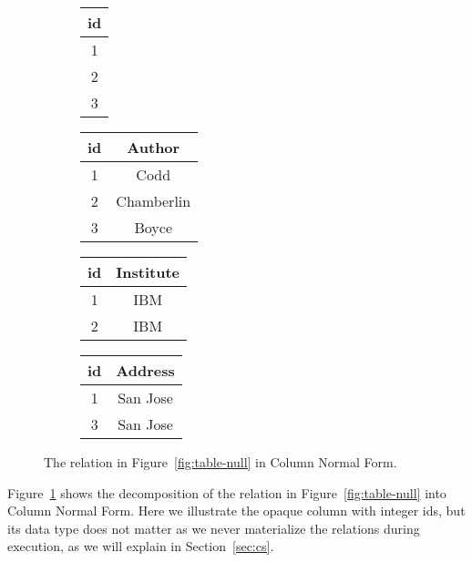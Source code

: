 \documentclass[sigconf,nonacm]{acmart}
\begin{document}
\begin{figure}
\begin{subfigure}{0.09\linewidth}
\centering
\begin{tabular}{|c|}
\hline
\textsf{id} \\
\hline
1 \\
2 \\
3 \\
\hline
\end{tabular}
\end{subfigure}
\begin{subfigure}{0.31\linewidth}
\centering
\begin{tabular}{|c|c|}
\hline
\textsf{id} & \textsf{Author} \\
\hline
1 & Codd \\
2 & Chamberlin \\
3 & Boyce \\
\hline
\end{tabular}
\end{subfigure}
\centering
\begin{subfigure}{0.26\linewidth}
\centering
\begin{tabular}{|c|c|}
\hline
\textsf{id} & \textsf{Institute} \\
\hline
1 & IBM \\
2 & IBM \\
\hline
\end{tabular}
\end{subfigure}
\begin{subfigure}{0.26\linewidth}
\centering 
\begin{tabular}{|c|c|}
\hline
\textsf{id} & \textsf{Address} \\
\hline
1 & San Jose \\
3 & San Jose \\
\hline
\end{tabular}
\end{subfigure}
\caption{The relation in Figure~\ref{fig:table-null} in Column Normal Form.}
\label{fig:cnf}
\end{figure}

\begin{example}
\label{ex:cnf}
Figure~\ref{fig:cnf} shows the decomposition of the relation 
 in Figure~\ref{fig:table-null} into Column Normal Form.
Here we illustrate the opaque column with integer ids,
 but its data type does not matter as we never 
 materialize the relations during execution,
 as we will explain in Section~\ref{sec:cs}.
\end{example}
\end{document}
